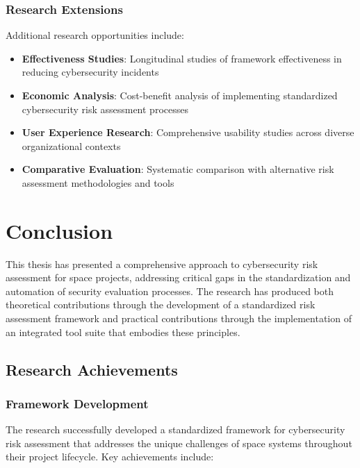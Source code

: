 \documentclass[binding=0.6cm]{sapthesis}
\begin{document}
\subsection{Research Extensions}

Additional research opportunities include:

\begin{itemize}
    \item \textbf{Effectiveness Studies}: Longitudinal studies of framework effectiveness in reducing cybersecurity incidents
    \item \textbf{Economic Analysis}: Cost-benefit analysis of implementing standardized cybersecurity risk assessment processes
    \item \textbf{User Experience Research}: Comprehensive usability studies across diverse organizational contexts
    \item \textbf{Comparative Evaluation}: Systematic comparison with alternative risk assessment methodologies and tools
\end{itemize}

\chapter{Conclusion}
\label{ch:conclusion}

This thesis has presented a comprehensive approach to cybersecurity risk assessment for space projects, addressing critical gaps in the standardization and automation of security evaluation processes. The research has produced both theoretical contributions through the development of a standardized risk assessment framework and practical contributions through the implementation of an integrated tool suite that embodies these principles.

\section{Research Achievements}

\subsection{Framework Development}

The research successfully developed a standardized framework for cybersecurity risk assessment that addresses the unique challenges of space systems throughout their project lifecycle. Key achievements include:
\end{document}
